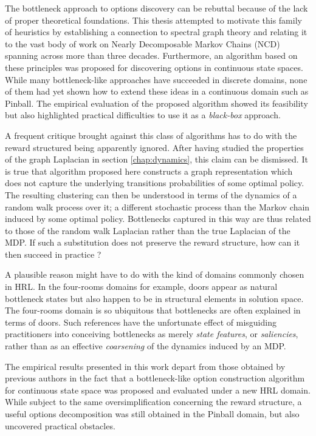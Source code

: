 The bottleneck approach to options discovery can be rebuttal because of the lack of proper theoretical foundations. This thesis attempted to motivate this family of heuristics by establishing a connection to spectral graph theory and relating it to the vast body of work on Nearly Decomposable Markov Chains (NCD) spanning across more than three decades. Furthermore, an algorithm based on these principles was proposed for discovering options in continuous state spaces. While many bottleneck-like approaches have succeeded in discrete domains, none of them had yet shown how to extend these ideas in a continuous domain such as Pinball. The empirical evaluation of the proposed algorithm showed its feasibility but also highlighted practical difficulties to use it as a \textit{black-box} approach.

A frequent critique brought against this class of algorithms has to do with the reward structured being apparently ignored. After having studied the properties of the graph Laplacian in section \ref{chap:dynamics}, this claim can be dismissed. It is true that algorithm proposed here constructs a graph representation which does not capture the underlying transitions probabilities of some optimal policy. The resulting clustering can then be understood in terms of the dynamics of a random walk process over it; a different stochastic process than the Markov chain induced by some optimal policy. Bottlenecks captured in this way are thus related to those of the random walk Laplacian rather than the true Laplacian of the MDP. If such a substitution does not preserve the reward structure, how can it then succeed in practice ?

A plausible reason might have to do with the kind of domains commonly chosen in HRL. In the four-rooms domains for example, doors appear as natural bottleneck states but also happen to be in structural elements in solution space. The four-rooms domain is so ubiquitous that bottlenecks are often explained in terms of doors. Such references have the unfortunate effect of misguiding practitioners into conceiving bottlenecks as merely \textit{state features}, or \textit{saliencies}, rather than as an effective \textit{coarsening} of the dynamics induced by an MDP.

The empirical results presented in this work depart from those obtained by previous authors in the fact that a bottleneck-like option construction algorithm for continuous state space was proposed and evaluated under a new HRL domain. While subject to the same oversimplification concerning the reward structure, a useful options decomposition was still obtained in the Pinball domain, but also uncovered practical obstacles. 

